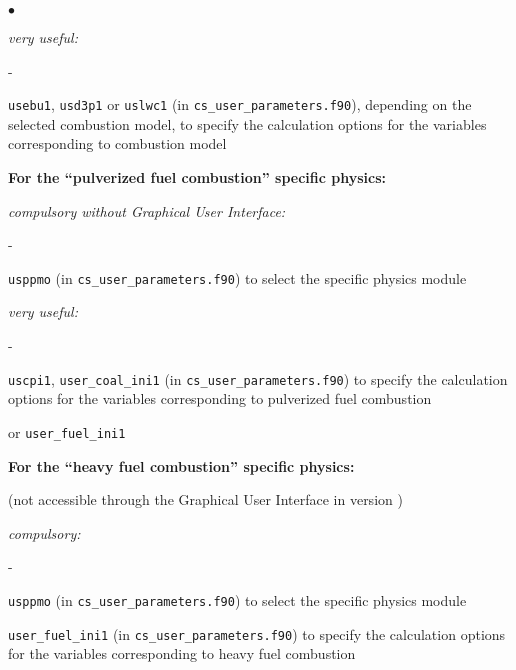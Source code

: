 {{{\begin{list}{$\bullet$}{}
\begin{list}{}{}
\begin{list}{}{}
        \item {\em very useful:}
        \begin{list}{-}{}
            \item  \texttt{usebu1}, \texttt{usd3p1} or \texttt{uslwc1}
                   (in \texttt{cs\_user\_parameters.f90}), 
                   depending on the selected combustion model,
                   to specify the calculation options
                   for the variables
                   corresponding to combustion model
        \end{list}
    \end{list}

  \item{\bf For the ``pulverized fuel combustion'' specific physics:}

    \begin{list}{}{}
        \item {\em compulsory without Graphical User Interface:}
        \begin{list}{-}{}
            \item \texttt{usppmo} (in \texttt{cs\_user\_parameters.f90}) 
               to select the specific physics module
        \end{list}

        \item {\em very useful:}
        \begin{list}{-}{}
            \item  \texttt{uscpi1}, \texttt{user\_coal\_ini1}
               (in \texttt{cs\_user\_parameters.f90})
               to specify the calculation options
                   for the variables
                   corresponding to pulverized fuel combustion
        \end{list}
    \end{list}

or \texttt{user\_fuel\_ini1} 
  \item{\bf For the ``heavy fuel combustion'' specific physics:}

 (not accessible through the Graphical User Interface in version \verscs)
    \begin{list}{}{}
        \item {\em compulsory:}
        \begin{list}{-}{}
            \item \texttt{usppmo} (in \texttt{cs\_user\_parameters.f90}) 
               to select the specific physics module
            \item \texttt{user\_fuel\_ini1}
               (in \texttt{cs\_user\_parameters.f90})
               to specify the calculation options
                   for the variables
                   corresponding to heavy fuel combustion
        \end{list}
    \end{list}



\end{list}
\end{list}}}}
